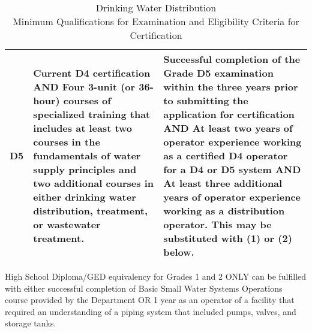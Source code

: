 \documentclass[10pt]{article}
\begin{document}
\begin{center}
\begin{table}[]
\begin{tabular}{|c|p{7.1cm}|p{7cm}|}
D5    & Current D4 certification AND Four 3-unit (or 36-hour) courses of specialized training that   includes at least two courses in the fundamentals of water supply principles   and two additional courses in either drinking water distribution, treatment,   or wastewater treatment. &Successful completion of the Grade   D5 examination within the three years prior to   submitting the application for certification AND At least two years of operator experience working as a   certified D4 operator for a D4 or D5 system AND At least three additional years of operator experience working as a   distribution operator. This may be substituted with (1) or (2) below.\\ \hline
\end{tabular}
\caption{Drinking Water Distribution\\
Minimum Qualifications for Examination and Eligibility Criteria for Certification}

\end{table}
\end{center}

High School Diploma/GED equivalency for Grades 1 and 2 ONLY can be fulfilled with either successful completion of Basic Small Water Systems Operations course provided by the Department OR 1 year as an operator of a facility that required an understanding of a piping system that included pumps, valves, and storage tanks.\\
\end{document}
